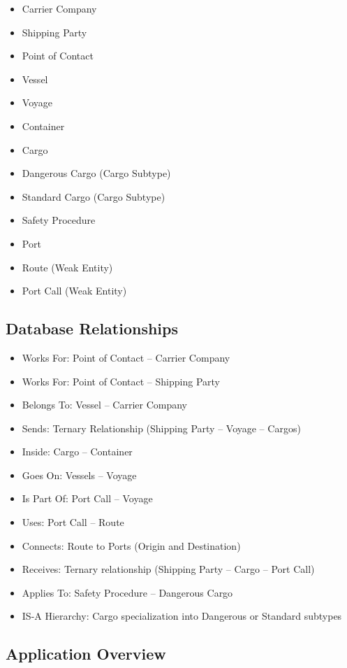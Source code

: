 \documentclass[11pt]{article}
\begin{document}
\begin{itemize}
    \item Carrier Company
    \item Shipping Party
    \item Point of Contact
    \item Vessel
    \item Voyage
    \item Container
    \item Cargo
    \item Dangerous Cargo (Cargo Subtype)
    \item Standard Cargo (Cargo Subtype)
    \item Safety Procedure
    \item Port
    \item Route (Weak Entity)
    \item Port Call (Weak Entity)
\end{itemize}

\subsection{Database Relationships}

\begin{itemize}
    \item Works For: Point of Contact -- Carrier Company
    \item Works For: Point of Contact -- Shipping Party
    \item Belongs To: Vessel -- Carrier Company
    \item Sends: Ternary Relationship (Shipping Party -- Voyage -- Cargos)
    \item Inside: Cargo -- Container
    \item Goes On: Vessels -- Voyage
    \item Is Part Of: Port Call -- Voyage
    \item Uses: Port Call -- Route
    \item Connects: Route to Ports (Origin and Destination)
    \item Receives: Ternary relationship (Shipping Party -- Cargo -- Port Call)
    \item Applies To: Safety Procedure -- Dangerous Cargo
    \item IS-A Hierarchy: Cargo specialization into Dangerous or Standard subtypes
\end{itemize}

\subsection{Application Overview}
\end{document}
